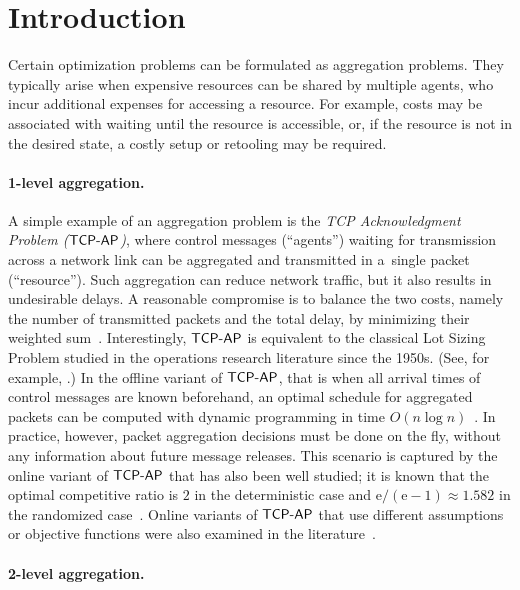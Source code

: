 \documentclass[a4paper]{article}
\newcommand{\TCPAP}{\mbox{\rm\textsf{TCP-AP}}}
\begin{document}
\section{Introduction}
\label{sec: introduction}

Certain optimization problems can be formulated as aggregation problems. They
typically arise when expensive resources can be shared by multiple agents, who
incur additional expenses for accessing a resource. 
For example, costs may be associated with
waiting until the resource is accessible, or, if the resource is not in the
desired state, a costly setup or retooling may be required.


\paragraph{1-level aggregation.}

A simple example of an aggregation problem is the \emph{TCP Acknowledgment
Problem ($\TCPAP$)}, where control messages (``agents'') waiting for transmission across a
network link can be aggregated and transmitted in a~single packet (``resource''). 
Such aggregation can
reduce network traffic, but it also results in undesirable delays. A reasonable compromise
is to balance the two costs, namely the number of transmitted
packets and the total delay, by minimizing their weighted sum~\cite{tcp-ack-det-journal}.
Interestingly, $\TCPAP$ is equivalent to the classical Lot Sizing Problem studied in the operations research literature
since the 1950s. (See, for example, \cite{wagner_whitin_58}.) In the offline variant of $\TCPAP$, that is
when all arrival times of control messages are known beforehand, an optimal schedule for
aggregated packets can be computed with dynamic programming in time $O(n\log n)$~\cite{aggarwal_park_93}.
In practice, however, packet aggregation decisions must be done on the fly,
without any information about future message releases. This scenario is captured by the
online variant of $\TCPAP$ that has also been well studied; it is known that the optimal competitive
ratio is $2$ in the deterministic case \cite{tcp-ack-det-journal}
and $\mathrm{e}/(\mathrm{e}-1) \approx 1.582$ in the randomized
case~\cite{tcp-ack,online-primal-dual-book,tcp-ack-lower-bound}.
Online variants of $\TCPAP$ that use different assumptions or objective functions 
were also examined in the literature~\cite{tcp-ack-logp,tcp-ack-long-delays}.


\paragraph{2-level aggregation.}
\end{document}
